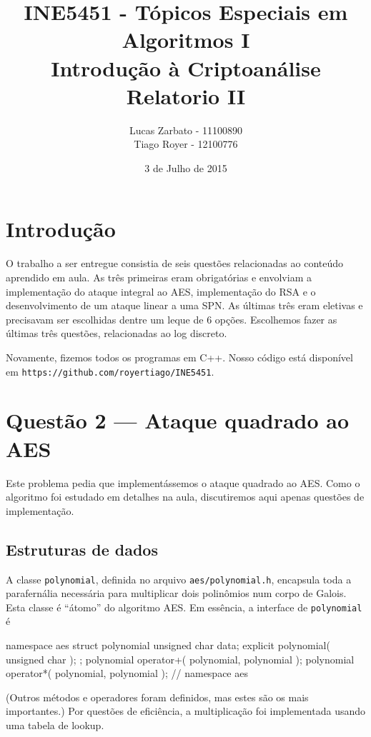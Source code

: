 \documentclass{article}
\title{
    INE5451 - Tópicos Especiais em Algoritmos I \\
    Introdução à Criptoanálise \\
    Relatorio II
}
\author{
    Lucas Zarbato - 11100890\\
    Tiago Royer - 12100776
}
\date{3 de Julho de 2015}
\begin{document}
\maketitle

\section{Introdução}

O trabalho a ser entregue consistia de seis questões
relacionadas ao conteúdo aprendido em aula.
As três primeiras eram obrigatórias
e envolviam a implementação do ataque integral ao AES,
implementação do RSA
e o desenvolvimento de um ataque linear a uma SPN.
As últimas três eram eletivas e precisavam ser escolhidas
dentre um leque de 6 opções.
Escolhemos fazer as últimas três questões, relacionadas ao log discreto.

Novamente, fizemos todos os programas em C++.
Nosso código está disponível em \texttt{https://github.com/royertiago/INE5451}.

\section{Questão 2 --- Ataque quadrado ao AES}

Este problema pedia que implementássemos o ataque quadrado ao AES.
Como o algoritmo foi estudado em detalhes na aula,
discutiremos aqui apenas questões de implementação.

\subsection{Estruturas de dados}

A classe \verb"polynomial", definida no arquivo \verb"aes/polynomial.h",
encapsula toda a parafernália necessária
para multiplicar dois polinômios num corpo de Galois.
Esta classe é ``átomo'' do algoritmo AES.
Em essência, a interface de \verb"polynomial" é
\begin{cppcode}
    namespace aes {
        struct polynomial {
            unsigned char data;
            explicit polynomial( unsigned char );
        };
        polynomial operator+( polynomial, polynomial );
        polynomial operator*( polynomial, polynomial );
    } // namespace aes
\end{cppcode}
(Outros métodos e operadores foram definidos,
mas estes são os mais importantes.)
Por questões de eficiência,
a multiplicação foi implementada usando uma tabela de lookup.
\end{document}
